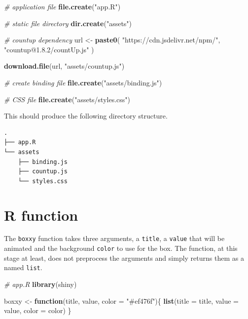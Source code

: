 \documentclass[
]{krantz}
\makeatletter
\newenvironment{Shaded}{\begin{snugshade}}{\end{snugshade}}
\newcommand{\CommentTok}[1]{\textcolor[rgb]{0.37,0.37,0.37}{\textit{#1}}}
\newcommand{\ControlFlowTok}[1]{\textcolor[rgb]{0.27,0.27,0.27}{\textbf{#1}}}
\newcommand{\DataTypeTok}[1]{\textcolor[rgb]{0.27,0.27,0.27}{#1}}
\newcommand{\KeywordTok}[1]{\textcolor[rgb]{0.27,0.27,0.27}{\textbf{#1}}}
\newcommand{\NormalTok}[1]{#1}
\newcommand{\StringTok}[1]{\textcolor[rgb]{0.5,0.5,0.5}{#1}}
\newenvironment{kframe}{%
\medskip{}
\setlength{\fboxsep}{.8em}
 \def\at@end@of@kframe{}%
 \ifinner\ifhmode%
  \def\at@end@of@kframe{\end{minipage}}%
  \begin{minipage}{\columnwidth}%
 \fi\fi%
 \def\FrameCommand##1{\hskip\@totalleftmargin \hskip-\fboxsep
 \colorbox{shadecolor}{##1}\hskip-\fboxsep
     \hskip-\linewidth \hskip-\@totalleftmargin \hskip\columnwidth}%
 \MakeFramed {\advance\hsize-\width
   \@totalleftmargin\z@ \linewidth\hsize
   \@setminipage}}%
 {\par\unskip\endMakeFramed%
 \at@end@of@kframe}
\renewenvironment{Shaded}{\begin{kframe}}{\end{kframe}}
\makeatother
\begin{document}
\begin{Shaded}
\begin{Highlighting}[]
\CommentTok{\# application file}
\KeywordTok{file.create}\NormalTok{(}\StringTok{"app.R"}\NormalTok{)}

\CommentTok{\# static file directory}
\KeywordTok{dir.create}\NormalTok{(}\StringTok{"assets"}\NormalTok{)}

\CommentTok{\# countup dependency}
\NormalTok{url <{-}}\StringTok{ }\KeywordTok{paste0}\NormalTok{(}
  \StringTok{"https://cdn.jsdelivr.net/npm/"}\NormalTok{,}
  \StringTok{"countup@1.8.2/countUp.js"}
\NormalTok{)}

\KeywordTok{download.file}\NormalTok{(url, }\StringTok{"assets/countup.js"}\NormalTok{)}

\CommentTok{\# create binding file}
\KeywordTok{file.create}\NormalTok{(}\StringTok{"assets/binding.js"}\NormalTok{)}

\CommentTok{\# CSS file}
\KeywordTok{file.create}\NormalTok{(}\StringTok{"assets/styles.css"}\NormalTok{)}
\end{Highlighting}
\end{Shaded}

This should produce the following directory structure.

\begin{verbatim}
.
├── app.R
└── assets
    ├── binding.js
    ├── countup.js
    └── styles.css
\end{verbatim}

\hypertarget{r-function}{%
\section{R function}\label{r-function}}

The \texttt{boxxy} function takes three arguments, a \texttt{title}, a \texttt{value} that will be animated and the background \texttt{color} to use for the box. The function, at this stage at least, does not preprocess the arguments and simply returns them as a named \texttt{list}.

\begin{Shaded}
\begin{Highlighting}[]
\CommentTok{\# app.R}
\KeywordTok{library}\NormalTok{(shiny)}

\NormalTok{boxxy <{-}}\StringTok{ }\ControlFlowTok{function}\NormalTok{(title, value, }\DataTypeTok{color =} \StringTok{"\#ef476f"}\NormalTok{)\{}
  \KeywordTok{list}\NormalTok{(}\DataTypeTok{title =}\NormalTok{ title, }\DataTypeTok{value =}\NormalTok{ value, }\DataTypeTok{color =}\NormalTok{ color)}
\NormalTok{\}}
\end{Highlighting}
\end{Shaded}
\end{document}
